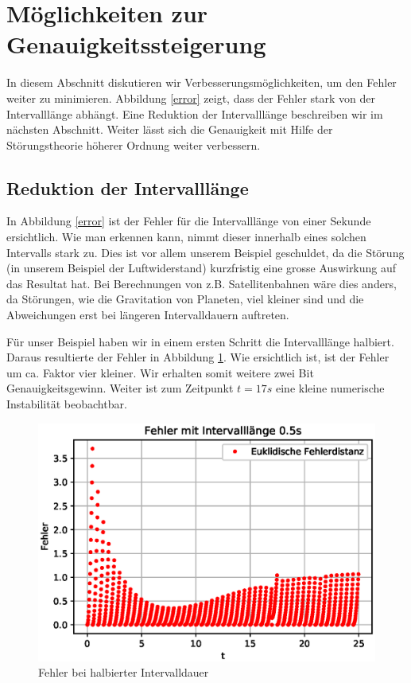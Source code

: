 \section{Möglichkeiten zur Genauigkeitssteigerung
\label{perturbation:section:weitereverbesserungen}}
In diesem Abschnitt diskutieren wir Verbesserungsmöglichkeiten, um den Fehler weiter zu minimieren.
Abbildung \ref{error} zeigt, dass der Fehler stark von der Intervalllänge abhängt.
Eine Reduktion der Intervalllänge beschreiben wir im nächsten Abschnitt.
Weiter lässt sich die Genauigkeit mit Hilfe der Störungstheorie höherer Ordnung weiter verbessern.

\subsection{Reduktion der Intervalllänge}
In Abbildung \ref{error} ist der Fehler für die Intervalllänge von einer Sekunde ersichtlich.
Wie man erkennen kann, nimmt dieser innerhalb eines solchen Intervalls stark zu.
Dies ist vor allem unserem Beispiel geschuldet, da die Störung (in unserem Beispiel der Luftwiderstand) kurzfristig eine grosse Auswirkung auf das Resultat hat.
Bei Berechnungen von z.B. Satellitenbahnen wäre dies anders, da Störungen,
wie die Gravitation von Planeten, viel kleiner sind und die Abweichungen erst bei längeren Intervalldauern auftreten.

Für unser Beispiel haben wir in einem ersten Schritt die Intervalllänge halbiert.
Daraus resultierte der Fehler in Abbildung \ref{errorShortInterval}.
Wie ersichtlich ist, ist der Fehler um ca. Faktor vier kleiner.
Wir erhalten somit weitere zwei Bit Genauigkeitsgewinn.
Weiter ist zum Zeitpunkt $t=17s$ eine kleine numerische Instabilität beobachtbar.

\begin{figure}
    \centering
    \includegraphics[scale=0.7]{papers/perturbation/bilder/perturbation_fig4.eps}
    \caption{Fehler bei halbierter Intervalldauer}
	\label{errorShortInterval}
\end{figure}

